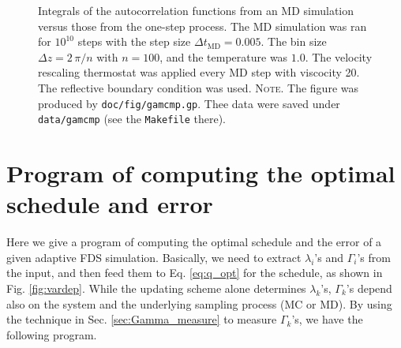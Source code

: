 \documentclass[reprint, floatfix]{revtex4-1}
\newcommand{\note}[1]{{\color{DarkGreen}\footnotesize \textsc{Note.} #1}}
\begin{document}
\begin{figure}[h]
\begin{center}
  \caption{
    \label{fig:gamcmp}
    Integrals of the autocorrelation functions
    from an MD simulation versus those
    from the one-step process.
    The MD simulation was ran for $10^{10}$ steps with
    the step size $\Delta t_\mathrm{MD} = 0.005$.
    The bin size $\Delta z = 2\, \pi /n$ with $n = 100$,
    and the temperature was $1.0$.
    The velocity rescaling\cite{bussi2007} thermostat was
    applied every MD step with viscocity 20.
    The reflective boundary condition was used.
    \note{The figure was produced by \texttt{doc/fig/gamcmp.gp}.
      Thee data were saved under \texttt{data/gamcmp}
      (see the \texttt{Makefile} there).
    }%
  }
\end{center}
\end{figure}






\section{\label{sec:program}
Program of computing the optimal schedule and error
}


Here we give a program of computing
the optimal schedule and the error
of a given adaptive FDS simulation.
%
Basically, we need to extract
$\lambda_i$'s and $\Gamma_i$'s
from the input,
and then feed them to Eq. \eqref{eq:q_opt}
for the schedule,
as shown in Fig. \ref{fig:vardep}.
%
%
While the updating scheme alone
determines $\lambda_k$'s,
$\Gamma_k$'s depend also on the system
and the underlying sampling process (MC or MD).
%
By using the technique in Sec. \ref{sec:Gamma_measure}
to measure $\Gamma_k$'s,
we have the following program.
\end{document}
